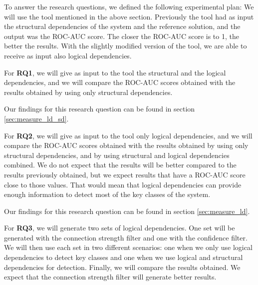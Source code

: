 \documentclass[runningheads]{comsis2}
\begin{document}
To answer the research questions, we defined the following experimental plan: 
We will use the tool mentioned in the above section. Previously the tool had as input the structural dependencies of the system and the reference solution, and the output was the ROC-AUC score. The closer the ROC-AUC score is to 1, the better the results.  
With the slightly modified version of the tool, we are able to receive as input also logical dependencies.


For \textbf {RQ1}, we will give as input to the tool the structural and the logical dependencies, and we will compare the ROC-AUC scores obtained with the results obtained by using only structural dependencies.


\noindent{}
\medskip

Our findings for this research question can be found in section \ref{sec:measure_ld_sd}.


For \textbf {RQ2}, we will give as input to the tool only logical dependencies, and we will compare the ROC-AUC scores obtained with the results obtained by using only structural dependencies, and by using structural and logical dependencies combined.
We do not expect that the results will be better compared to the results previously obtained, but we expect results that have a ROC-AUC score close to those values. That would mean that logical dependencies can provide enough information to detect most of the key classes of the system.

\medskip

\noindent{}

\medskip

Our findings for this research question can be found in section \ref{sec:measure_ld}.

For \textbf {RQ3}, we will generate two sets of logical dependencies. One set will be generated with the connection strength filter and one with the confidence filter. We will then use each set in two different scenarios: one when we only use logical dependencies to detect key classes and one when we use logical and structural dependencies for detection. Finally, we will compare the results obtained. We expect that the connection strength filter will generate better results. 
\end{document}
